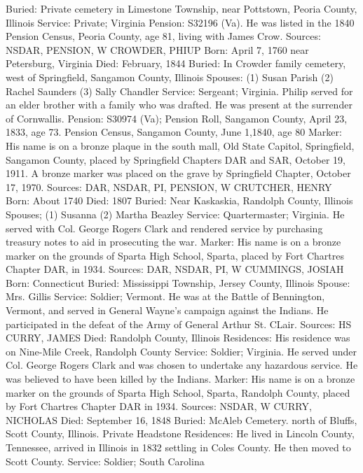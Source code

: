 Buried: Private cemetery in Limestone Township, near Pottstown, Peoria County, Illinois 
Service: Private; Virginia 
Pension: S32196 (Va). He was listed in the 1840 Pension Census, Peoria County, age 81, living with James Crow. 
Sources: NSDAR, PENSION, W 
CROWDER, PHIUP 
Born: April 7, 1760 near Petersburg, Virginia 
Died: February, 1844 
Buried: In Crowder family cemetery, west of Springfield, Sangamon County, Illinois 
Spouses: (1) Susan Parish
	 (2) Rachel Saunders
	 (3) Sally Chandler 
Service: Sergeant; Virginia. Philip served for an elder brother with a family who was drafted. He was present at the surrender of Cornwallis. 
Pension: S30974 (Va); Pension Roll, Sangamon County, April 23, 1833, age 73. Pension Census, Sangamon County, June 1,1840, age 80 
Marker: His name is on a bronze plaque in the south mall, Old State Capitol, Springfield, Sangamon County, placed by Springfield Chapters DAR and SAR, October 19, 1911. A bronze marker was placed on the grave by Springfield Chapter, October 17, 1970. 
Sources: DAR, NSDAR, PI, PENSION, W 
CRUTCHER, HENRY 
Born: About 1740 
Died: 1807 
Buried: Near Kaskaskia, Randolph County, Illinois 
Spouses; (1) Susanna 
	 (2) Martha Beazley 
Service: Quartermaster; Virginia. He served with Col. George Rogers Clark and rendered service by purchasing treasury notes to aid in prosecuting the war. 
Marker: His name is on a bronze marker on the grounds of Sparta High School, Sparta, placed by Fort Chartres Chapter DAR, in 1934. 
Sources: DAR, NSDAR, PI, W 
CUMMINGS, JOSIAH 
Born: Connecticut 
Buried: Mississippi Township, Jersey County, Illinois 
Spouse: Mrs. Gillis 
Service: Soldier; Vermont. He was at the Battle of Bennington, Vermont, and served in General Wayne's campaign against the Indians. He participated in the defeat of the Army of General Arthur St. CLair. 
Sources: HS 
CURRY, JAMES 
Died: Randolph County, Illinois 
Residences: His residence was on Nine-Mile Creek, Randolph County 
Service: Soldier; Virginia. He served under Col. George Rogers Clark and was chosen to undertake any hazardous service. He was believed to have been killed by the Indians. 
Marker: His name is on a bronze marker on the grounds of Sparta High School, Sparta, Randolph County, placed by Fort Chartres Chapter DAR in 1934. 
Sources: NSDAR, W 
CURRY, NICHOLAS 
Died: September 16, 1848 
Buried: McAleb Cemetery. north of Bluffs, Scott County, Illinois. Private Head­stone 
Residences: He lived in Lincoln County, Tennessee, arrived in Illinois in 1832 settling in Coles County. He then moved to Scott County. 
Service: Soldier; South Carolina 
